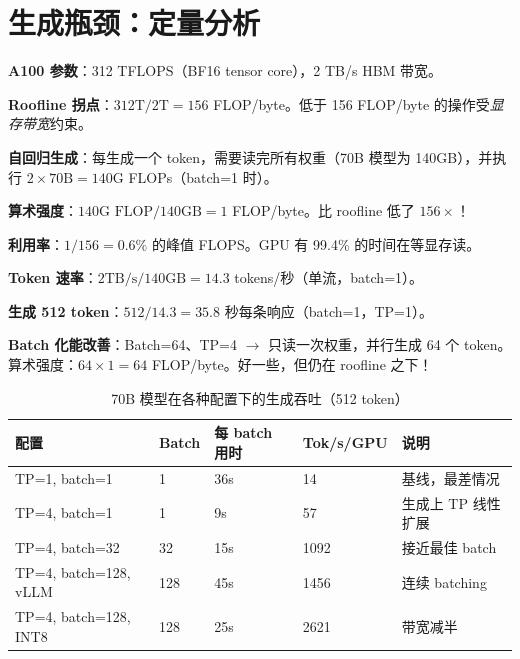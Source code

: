 \section{生成瓶颈：定量分析}
\label{the-generation-bottleneck-quantitative-analysis}

\begin{intuitionbox}
\textbf{A100 参数}：312 TFLOPS（BF16 tensor core），2 TB/s HBM 带宽。

\textbf{Roofline 拐点}：$312\text{T} / 2\text{T} = 156$ FLOP/byte。低于 156 FLOP/byte 的操作受\emph{显存带宽}约束。

\textbf{自回归生成}：每生成一个 token，需要读完所有权重（70B 模型为 140GB），并执行 $2 \times 70\text{B} = 140\text{G}$ FLOPs（batch=1 时）。

\textbf{算术强度}：$140\text{G FLOP} / 140\text{GB} = 1$ FLOP/byte。比 roofline 低了 $156\times$！

\textbf{利用率}：$1/156 = 0.6\%$ 的峰值 FLOPS。GPU 有 99.4\% 的时间在等显存读。

\textbf{Token 速率}：$2\text{TB/s} / 140\text{GB} = 14.3$ tokens/秒（单流，batch=1）。

\textbf{生成 512 token}：$512 / 14.3 = 35.8$ 秒每条响应（batch=1，TP=1）。

\textbf{Batch 化能改善}：Batch=64、TP=4 $\rightarrow$ 只读一次权重，并行生成 64 个 token。算术强度：$64 \times 1 = 64$ FLOP/byte。好一些，但仍在 roofline 之下！
\end{intuitionbox}

\begin{table}[ht!]
\centering
\caption{70B 模型在各种配置下的生成吞吐（512 token）}
{\footnotesize
\begin{tabularx}{0.88\linewidth}{@{}Z{1.12} l l l Z{0.88}@{}}
\toprule
\textbf{配置} & \textbf{Batch} & \textbf{每 batch 用时} & \textbf{Tok/s/GPU} & \textbf{说明} \\
\midrule
TP=1, batch=1 & 1 & 36s & 14 & 基线，最差情况 \\
TP=4, batch=1 & 1 & 9s & 57 & 生成上 TP 线性扩展 \\
TP=4, batch=32 & 32 & 15s & 1092 & 接近最佳 batch \\
TP=4, batch=128, vLLM & 128 & 45s & 1456 & 连续 batching \\
TP=4, batch=128, INT8 & 128 & 25s & 2621 & 带宽减半 \\
\bottomrule
\end{tabularx}
}
\end{table}

